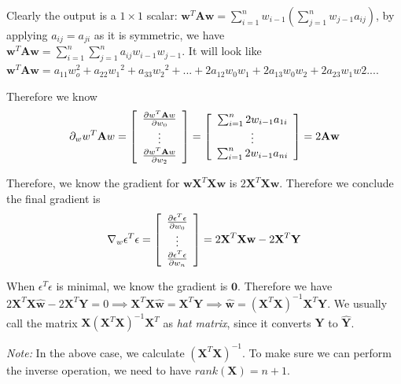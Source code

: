 \documentclass{article}
\theoremstyle{definition}
\begin{document}
Clearly the output is a $1\times 1$ scalar: $\textbf{w}^{T}\textbf{A}\textbf{w}=\sum_{i=1}^{n}w_{i-1}(\sum_{j=1}^{n}w_{j-1}a_{ij})$, by applying $a_{ij}=a_{ji}$ as it is symmetric, we have $\textbf{w}^{T}\textbf{A}\textbf{w}=\sum_{i=1}^{n}\sum_{j=1}^{n}a_{ij}w_{i-1}w_{j-1}$. It will look like $\textbf{w}^{T}\textbf{A}\textbf{w}=a_{11}w_o^{2}+a_{22}{w_1}^{2}+a_{33}{w_2}^{2}+...+2a_{12}w_0w_1+2a_{13}w_0w_2+2a_{23}w_1w2...$.

Therefore we know $$\partial_w w^{T}\textbf{A}w=\left[ {\begin{array}{*{20}c}
   \frac{\partial w^{T}\textbf{A}w}{\partial w_0} \\
   \vdots\\
   \frac{\partial w^{T}\textbf{A}w}{\partial w_2} \\
 \end{array} } \right] = \left[ {\begin{array}{*{20}c}
   \sum_{i=1}^{n}2w_{i-1}a_{1i}\\
   \vdots \\
   \sum_{i=1}^{n}2w_{i-1}a_{ni}\\
 \end{array} } \right]=2\textbf{A}\textbf{w}$$

Therefore, we know the gradient for $\textbf{w}\textbf{X}^{T}\textbf{X}\textbf{w}$ is $2\textbf{X}^{T}\textbf{X}\textbf{w}$. Therefore we conclude the final gradient is 
$$
\nabla_w\epsilon^{T}\epsilon=\left[ {\begin{array}{*{20}c}
   \frac{\partial\epsilon^{T}\epsilon}{\partial w_0}\\
   \vdots \\
   \frac{\partial\epsilon^{T}\epsilon}{\partial w_n}\\
 \end{array} } \right]=2\textbf{X}^{T}\textbf{X}\textbf{w}-2\textbf{X}^{T}\textbf{Y}
$$

When $\epsilon^{T}\epsilon$ is minimal, we know the gradient is $\textbf{0}$. Therefore we have $2\textbf{X}^{T}\textbf{X}\hat{\textbf{w}}-2\textbf{X}^{T}\textbf{Y}=0 \implies \textbf{X}^{T}\textbf{X}\hat{\textbf{w}}=\textbf{X}^{T}\textbf{Y} \implies \hat{\textbf{w}}=(\textbf{X}^{T}\textbf{X})^{-1}\textbf{X}^{T}\textbf{Y}$. We usually call the matrix $\textbf{X}(\textbf{X}^{T}\textbf{X})^{-1}\textbf{X}^{T}$ as \textit{hat matrix}, since it converts $\textbf{Y}$ to $\hat{\textbf{Y}}$.

\textit{Note: } In the above case, we calculate $(\textbf{X}^{T}\textbf{X})^{-1}$. To make sure we can perform the inverse operation, we need to have $rank(\textbf{X})=n+1$.
\end{document}
